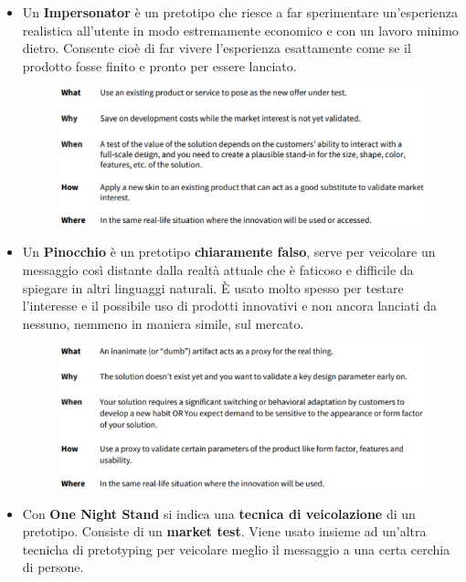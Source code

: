 \begin{itemize}
	\item Un \textbf{Impersonator} è un pretotipo che riesce a far sperimentare un'esperienza realistica all'utente in modo estremamente economico e con un lavoro minimo dietro. Consente cioè di
	      far vivere l'esperienza esattamente come se il prodotto fosse finito e pronto per essere lanciato.

	      \begin{figure}[!h]
		      \centering
		      \includegraphics[scale=0.42]{immagini/Impersonator.png}
	      \end{figure}

	      \pagebreak

	\item Un \textbf{Pinocchio} è un pretotipo \textbf{chiaramente falso}, serve per veicolare un messaggio così distante dalla realtà attuale che è faticoso e difficile da spiegare in altri linguaggi naturali. È usato molto spesso per testare l'interesse e il possibile uso di prodotti innovativi e non ancora lanciati da nessuno, nemmeno in maniera simile, sul mercato.

	      \begin{figure}[!h]
		      \centering
		      \includegraphics[scale=0.5]{immagini/Pinocchio.png}
	      \end{figure}

	\item Con \textbf{One Night Stand} si indica una \textbf{tecnica di veicolazione} di un pretotipo. Consiste di un \textbf{market test}.
	      Viene usato insieme ad un'altra tecnicha di pretotyping per veicolare meglio il messaggio a una certa cerchia di persone.


\end{itemize}
